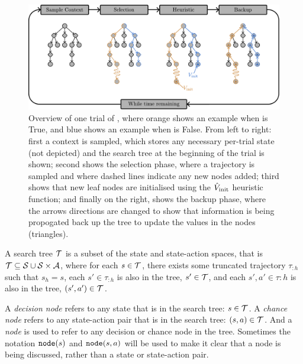         \begin{figure}
            \centering\includegraphics[width=1.0\textwidth]{figures/ch2/thts_trial.pdf} 
            \caption[Overview of one trial of \thtspp.]{Overview of one trial of \thtspp, where orange shows an example when \mctsmode\ewe is True, and blue shows an example when \mctsmode\ewe is False. From left to right: first a context is sampled, which stores any necessary per-trial state (not depicted) and the search tree at the beginning of the trial is shown; second shows the selection phase, where a trajectory is sampled and where dashed lines indicate any new nodes added; third shows that new leaf nodes are initialised using the ${\hat{V}_{\textnormal{init}}}$ heuristic function; and finally on the right, shows the backup phase, where the arrows directions are changed to show that information is being propogated back up the tree to update the values in the nodes (triangles).}
            \label{fig:2:thts}
        \end{figure}

        \begin{defn}
            \label{def:2:search_tree}
            A \textnormal{search tree} $\mathcal{T}$ is a subset of the state and state-action spaces, that is $\mathcal{T}\subseteq \mathcal{S} \cup \mathcal{S} \times \mathcal{A}$, where for each $s\in\mathcal{T}$, there exists some truncated trajectory $\tau_{:h}$ such that $s_h = s$, each $s'\in\tau_{:h}$ is also in the tree, $s'\in\mathcal{T}$, and each $s',a'\in\tau{:h}$ is also in the tree, $(s',a')\in\mathcal{T}$.
        \end{defn}

            A \textit{decision node} refers to any state that is in the search tree: $s\in\mathcal{T}$. A \textit{chance node} refers to any state-action pair that is in the search tree: $(s,a)\in\mathcal{T}$. And a \textit{node} is used to refer to any decision or chance node in the tree. Sometimes the notation ${\textnormal{\texttt{node}}}(s)$ and ${\textnormal{\texttt{node}}}(s,a)$ will be used to make it clear that a node is being discussed, rather than a state or state-action pair.

